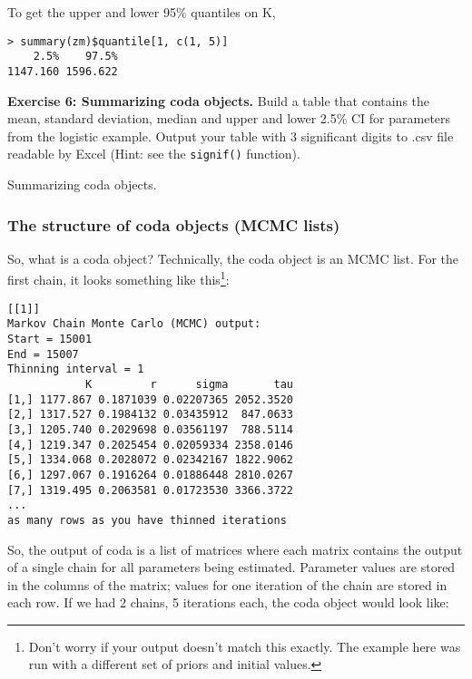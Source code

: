 \documentclass[12pt,english]{article}
\begin{document}
{\noindent To get the upper and lower 95\% quantiles on K, 

\begin{Verbatim}
> summary(zm)$quantile[1, c(1, 5)]
    2.5%    97.5%
1147.160 1596.622
\end{Verbatim}

\bigskip
\belowcaptionskip=-40pt
\begin{exercise}
\begin{mdframed}
\doublespacing
\textbf{Exercise 6: Summarizing coda objects.} Build a table that contains the mean, standard deviation, median and upper and lower 2.5\% CI for parameters from the logistic example. Output your table with 3 significant digits to .csv file readable by Excel (Hint: see the \texttt{signif()} function).
\end{mdframed}
\captionsetup{textformat=empty, labelformat=empty}
\caption[Manipulating coda summaries]{Summarizing coda objects.}
\label{ex:coda manipulation}
\end{exercise}
\belowcaptionskip=0pt

\subsubsection{The structure of coda objects (MCMC lists)}

So, what is a coda object? Technically, the coda object is an MCMC list. For the first chain, it looks something like this\footnote{Don't worry if your output doesn't match this exactly. The example here was run with a different set of priors and initial values.}:

\begin{Verbatim}[fontsize=\small]
[[1]]
Markov Chain Monte Carlo (MCMC) output:
Start = 15001
End = 15007
Thinning interval = 1
            K         r      sigma       tau
[1,] 1177.867 0.1871039 0.02207365 2052.3520
[2,] 1317.527 0.1984132 0.03435912  847.0633
[3,] 1205.740 0.2029698 0.03561197  788.5114
[4,] 1219.347 0.2025454 0.02059334 2358.0146
[5,] 1334.068 0.2028072 0.02342167 1822.9062
[6,] 1297.067 0.1916264 0.01886448 2810.0267
[7,] 1319.495 0.2063581 0.01723530 3366.3722
...
as many rows as you have thinned iterations
\end{Verbatim}

\noindent So, the output of coda is a list of matrices where each matrix contains the output of a single chain for all parameters being estimated. Parameter values are stored in the columns of the matrix; values for one iteration of the chain are stored in each row. If we had 2 chains, 5 iterations each, the coda object would look like:

}
\end{document}
